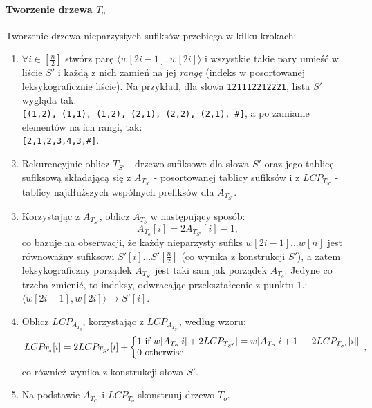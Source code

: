     \paragraph{Tworzenie drzewa $T_o$}
    Tworzenie drzewa nieparzystych sufiksów przebiega w kilku krokach:
    \begin{enumerate}
     \item $\forall i \in [\frac{n}{2}]$ stwórz parę $\langle w[2i-1], w[2i] \rangle$ i wszystkie takie pary umieść w liście $S'$ i każdą z nich zamień na jej \textit{rangę} (indeks w posortowanej leksykograficznie liście). Na przykład, dla słowa \verb|121112212221|, lista $S'$ wygląda tak: \\
     \verb|[(1,2), (1,1), (1,2), (2,1), (2,2), (2,1), #]|, a po zamianie elementów na ich rangi, tak: \\
     \verb|[2,1,2,3,4,3,#]|.
     \item Rekurencyjnie oblicz $T_{S'}$ - drzewo sufiksowe dla słowa $S'$ oraz jego tablicę sufiksową składającą się z $A_{T_{S'}}$ - posortowanej tablicy sufiksów i z $LCP_{T_{S'}}$ - tablicy najdłuższych wspólnych prefiksów dla $A_{T_{S'}}$.
     \item Korzystając z $A_{T_{S'}}$, oblicz $A_{T_o}$ w następujący sposób:
     $$
        A_{T_o}[i] = 2A_{T_{S'}}[i] - 1,
     $$
     co bazuje na obserwacji, że każdy nieparzysty sufiks $w[2i-1]...w[n]$ jest równoważny sufiksowi $S'[i]...S'[\frac{n}{2}]$ (co wynika z konstrukcji $S'$), a zatem leksykograficzny porządek $A_{T_{S'}}$ jest taki sam jak porządek $A_{T_o}$. Jedyne co trzeba zmienić, to indeksy, odwracając przekształcenie z punktu $1.$: $\langle w[2i-1],w[2i] \rangle \rightarrow S'[i]$.
     \item Oblicz $LCP_{A_{T_o}}$, korzystając z $LCP_{A_{T_{S'}}}$, według wzoru:
      \begin{align*}
      \left.
       LCP_{T_o}[i] = 2LCP_{T_{S'}}[i] + \bigg\{
       \begin{array}{@{}l}
        1 \text{ if } w[A_{T_o}[i] + 2LCP_{T_{S'}}] = w[A_{T_o}[i+1] + 2LCP_{T_{S'}}[i]]   \\
        0 \text{ otherwise}
       \end{array},
        \right.              
      \end{align*}
      co również wynika z konstrukcji słowa $S'$.
    \item Na podstawie $A_{T_O}$ i $LCP_{T_o}$ skonstruuj drzewo $T_o$.
    \end{enumerate}
